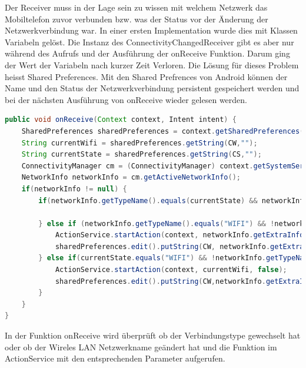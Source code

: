  Der Receiver muss in der Lage sein zu wissen mit welchem Netzwerk das Mobiltelefon zuvor verbunden bzw. was der Status vor der Änderung der Netzwerkverbindung war. In einer ersten Implementation wurde dies mit Klassen Variabeln gelöst. Die Instanz des ConnectivityChangedReceiver gibt es aber nur während des Aufrufs und der Ausführung der onReceive Funktion. Darum ging der Wert der Variabeln nach kurzer Zeit Verloren. Die Lösung für dieses Problem heisst Shared Preferences. Mit den Shared Prefrences von Android können der Name und den Status der Netzwerkverbindung persistent gespeichert werden und bei der nächsten Ausführung von onReceive wieder gelesen werden.
\begin{lstlisting}[language=Java]
public void onReceive(Context context, Intent intent) {
    SharedPreferences sharedPreferences = context.getSharedPreferences("com.koki.app.wifiaction",Context.MODE_PRIVATE);
    String currentWifi = sharedPreferences.getString(CW,"");
    String currentState = sharedPreferences.getString(CS,"");
    ConnectivityManager cm = (ConnectivityManager) context.getSystemService(Context.CONNECTIVITY_SERVICE);
    NetworkInfo networkInfo = cm.getActiveNetworkInfo();
    if(networkInfo != null) {
        if(networkInfo.getTypeName().equals(currentState) && networkInfo.getExtraInfo().equals(currentWifi) ) {

        } else if (networkInfo.getTypeName().equals("WIFI") && !networkInfo.getExtraInfo().equals(currentWifi)) {
            ActionService.startAction(context, networkInfo.getExtraInfo(), true);
            sharedPreferences.edit().putString(CW, networkInfo.getExtraInfo()).putString(CS,networkInfo.getTypeName()).commit();
        } else if(currentState.equals("WIFI") && !networkInfo.getTypeName().equals("WIFI")) {
            ActionService.startAction(context, currentWifi, false);
            sharedPreferences.edit().putString(CW,networkInfo.getExtraInfo()).putString(CS,networkInfo.getTypeName()).commit();
        }
    }
}
\end{lstlisting}
In der Funktion onReceive wird überprüft ob der Verbindungstype gewechselt hat oder ob der Wireles LAN Netzwerkname geändert hat und die Funktion im ActionService mit den entsprechenden Parameter aufgerufen.


